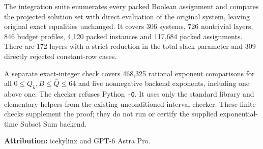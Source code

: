 The integration suite enumerates every packed Boolean assignment and compares the projected solution set with direct evaluation of the original system, leaving original exact equalities unchanged. It covers 306 systems, 726 nontrivial layers, 846 budget profiles, 4,120 packed instances and 117,684 packed assignments. There are 172 layers with a strict reduction in the total slack parameter and 309 directly rejected constant-row cases.

A separate exact-integer check covers 468,325 rational exponent comparisons for all \(0\le Q_k,B\le\bar Q\le64\) and five nonnegative backend exponents, including one above one. The checker refuses Python \texttt{-O}. It uses only the standard library and elementary helpers from the existing unconditioned interval checker. These finite checks supplement the proof; they do not run or certify the supplied exponential-time Subset Sum backend.

\textbf{Attribution:} icekylinx and GPT-6 Astra Pro.
